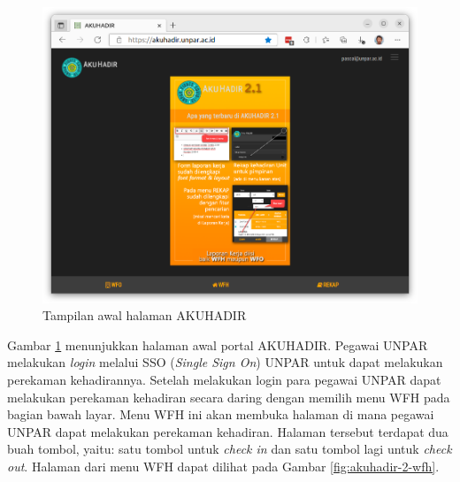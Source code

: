 \begin{figure}[H]
	\centering
	\includegraphics[scale=0.4]{Gambar/akuhadir-1-beranda.png}
	\caption{Tampilan awal halaman AKUHADIR} 
	\label{fig:akuhadir-1-beranda}
\end{figure}

Gambar \ref{fig:akuhadir-1-beranda} menunjukkan halaman awal portal AKUHADIR. Pegawai UNPAR melakukan \textit{login} melalui SSO (\textit{Single Sign On}) UNPAR untuk dapat melakukan perekaman kehadirannya. Setelah melakukan login para pegawai UNPAR dapat melakukan perekaman kehadiran secara daring dengan memilih menu WFH pada bagian bawah layar. Menu WFH ini akan membuka halaman di mana pegawai UNPAR dapat melakukan perekaman kehadiran. Halaman tersebut terdapat dua buah tombol, yaitu: satu tombol untuk \textit{check in} dan satu tombol lagi untuk \textit{check out}. Halaman dari menu WFH dapat dilihat pada Gambar \ref{fig:akuhadir-2-wfh}.

